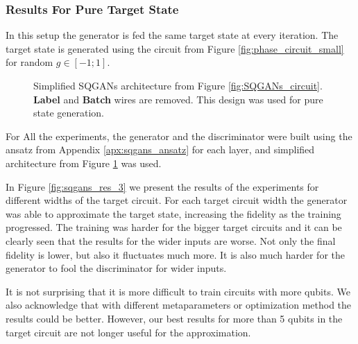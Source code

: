 \subsubsection{Results For Pure Target State}
In this setup the generator is fed the same target state at every iteration.
The target state is generated using the circuit from Figure
\ref{fig:phase_circuit_small} for random $g \in [-1; 1]$.


\begin{figure}[htbp!]
  \caption{Simplified SQGANs architecture from Figure \ref{fig:SQGANs_circuit}. \textbf{Label} and
    \textbf{Batch} wires are removed. This design was used for pure state
    generation. \label{fig:SQGANs_circuit_simple}}
\end{figure}

For All the experiments, the generator and the discriminator were built using
the ansatz from Appendix \ref{apx:sqgans_ansatz} for each layer, and simplified architecture
from Figure \ref{fig:SQGANs_circuit_simple} was used.

In Figure \ref{fig:sqgans_res_3} we present the
results of the experiments for different widths of the target circuit. 
For each target circuit width the generator was able to approximate the target state,
increasing the fidelity as the training progressed. The training was
harder for the bigger target circuits and it can be clearly seen that
the results for the wider inputs are worse. Not only the final fidelity is lower, but
also it fluctuates much more. It is also much harder for the generator to fool
the discriminator for wider inputs.

It is not surprising that it is more difficult to train circuits with more
qubits. We also acknowledge that with different metaparameters or optimization
method the results could be better. However, our best results for more than 5 qubits
in the target circuit are not longer useful for the approximation.

